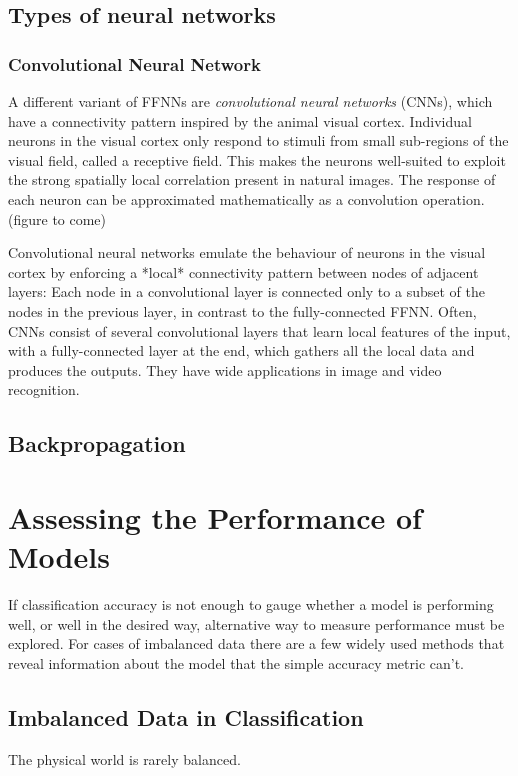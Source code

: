 \subsection{Types of neural networks}

\subsubsection*{Convolutional Neural Network}

A different variant of FFNNs are \textit{convolutional neural networks}
(CNNs), which have a connectivity pattern inspired by the animal
visual cortex. Individual neurons in the visual cortex only respond to
stimuli from small sub-regions of the visual field, called a receptive
field. This makes the neurons well-suited to exploit the strong
spatially local correlation present in natural images. The response of
each neuron can be approximated mathematically as a convolution
operation.  (figure to come)

Convolutional neural networks emulate the behaviour of neurons in the
visual cortex by enforcing a *local* connectivity pattern between
nodes of adjacent layers: Each node in a convolutional layer is
connected only to a subset of the nodes in the previous layer, in
contrast to the fully-connected FFNN.  Often, CNNs consist of several
convolutional layers that learn local features of the input, with a
fully-connected layer at the end, which gathers all the local data and
produces the outputs. They have wide applications in image and video
recognition.


\subsection{Backpropagation}

\section{Assessing the Performance of Models}
If classification accuracy is not enough to gauge whether a model is
performing well, or well in the desired way, alternative way to measure
performance must be explored. For cases of imbalanced data there are a few
widely used methods that reveal information about the model that the simple
accuracy metric can't.

\subsection{Imbalanced Data in Classification}
The physical world is rarely balanced.

